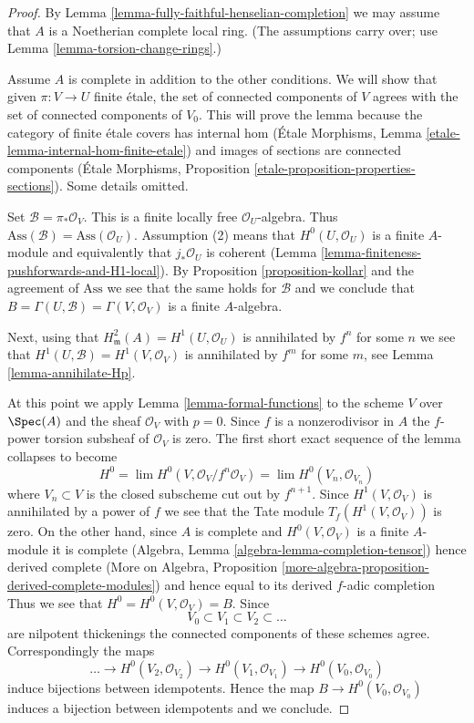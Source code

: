 \begin{proof}
By Lemma \ref{lemma-fully-faithful-henselian-completion}
we may assume that $A$ is a Noetherian complete local ring.
(The assumptions carry over; use Lemma \ref{lemma-torsion-change-rings}.)

\medskip\noindent
Assume $A$ is complete in addition to the other conditions.
We will show that given $\pi : V \to U$ finite \'etale, the set
of connected components of $V$ agrees with the set of connected
components of $V_0$. This will prove the lemma because the
category of finite \'etale covers has internal hom
(\'Etale Morphisms, Lemma \ref{etale-lemma-internal-hom-finite-etale})
and images of sections are connected components
(\'Etale Morphisms, Proposition \ref{etale-proposition-properties-sections}).
Some details omitted.

\medskip\noindent
Set $\mathcal{B} = \pi_*\mathcal{O}_V$. This is a finite locally free
$\mathcal{O}_U$-algebra. Thus
$\text{Ass}(\mathcal{B}) = \text{Ass}(\mathcal{O}_U)$.
Assumption (2) means that $H^0(U, \mathcal{O}_U)$ is a finite
$A$-module and equivalently that $j_*\mathcal{O}_U$ is coherent
(Lemma \ref{lemma-finiteness-pushforwards-and-H1-local}).
By Proposition \ref{proposition-kollar} and the agreement of $\text{Ass}$
we see that the same holds for $\mathcal{B}$ and we conclude
that $B = \Gamma(U, \mathcal{B}) = \Gamma(V, \mathcal{O}_V)$
is a finite $A$-algebra.

\medskip\noindent
Next, using that $H^2_\mathfrak m(A) = H^1(U, \mathcal{O}_U)$
is annihilated by $f^n$ for some $n$ we see that
$H^1(U, \mathcal{B}) = H^1(V, \mathcal{O}_V)$
is annihilated by $f^m$ for some $m$, see
Lemma \ref{lemma-annihilate-Hp}.

\medskip\noindent
At this point we apply Lemma \ref{lemma-formal-functions} to
the scheme $V$ over $\Spec(A)$ and the sheaf $\mathcal{O}_V$
with $p = 0$. Since $f$ is a nonzerodivisor in $A$ the $f$-power torsion
subsheaf of $\mathcal{O}_V$ is zero. The first short exact sequence
of the lemma collapses to become
$$
H^0 = \lim H^0(V, \mathcal{O}_V/f^n\mathcal{O}_V) =
\lim H^0(V_n, \mathcal{O}_{V_n})
$$
where $V_n \subset V$ is the closed subscheme cut out by $f^{n + 1}$.
Since $H^1(V, \mathcal{O}_V)$ is annihilated by a power
of $f$ we see that the Tate module $T_f(H^1(V, \mathcal{O}_V))$ is zero.
On the other hand, since $A$ is complete and
$H^0(V, \mathcal{O}_V)$ is a finite $A$-module
it is complete (Algebra, Lemma \ref{algebra-lemma-completion-tensor})
hence derived complete
(More on Algebra,
Proposition \ref{more-algebra-proposition-derived-complete-modules})
and hence equal to its derived $f$-adic completion
Thus we see that $H^0 = H^0(V, \mathcal{O}_V) = B$.
Since
$$
V_0 \subset V_1 \subset V_2 \subset \ldots
$$
are nilpotent thickenings the connected components of these schemes
agree. Correspondingly the maps
$$
\ldots \to
H^0(V_2, \mathcal{O}_{V_2}) \to
H^0(V_1, \mathcal{O}_{V_1}) \to
H^0(V_0, \mathcal{O}_{V_0})
$$
induce bijections between idempotents. Hence the map
$B \to H^0(V_0, \mathcal{O}_{V_0})$ induces a bijection between
idempotents and we conclude.
\end{proof}

